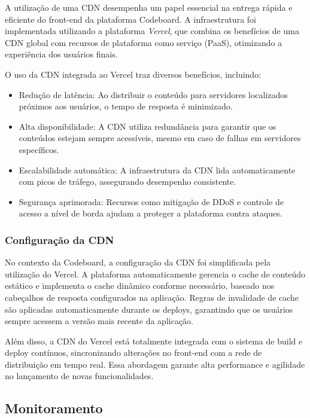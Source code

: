 A utilização de uma CDN desempenha um papel essencial na entrega rápida e eficiente do front-end da plataforma Codeboard. A infraestrutura foi implementada utilizando a plataforma \emph{Vercel}, que combina os benefícios de uma CDN global com recursos de plataforma como serviço (PaaS), otimizando a experiência dos usuários finais.

O uso da CDN integrada ao Vercel traz diversos benefícios, incluindo:

\begin{itemize}
    \item Redução de latência: Ao distribuir o conteúdo para servidores localizados próximos aos usuários, o tempo de resposta é minimizado.
    \item Alta disponibilidade: A CDN utiliza redundância para garantir que os conteúdos estejam sempre acessíveis, mesmo em caso de falhas em servidores específicos.
    \item Escalabilidade automática: A infraestrutura da CDN lida automaticamente com picos de tráfego, assegurando desempenho consistente.
    \item Segurança aprimorada: Recursos como mitigação de DDoS e controle de acesso a nível de borda ajudam a proteger a plataforma contra ataques.
\end{itemize}

\subsubsection{Configuração da CDN}

No contexto da Codeboard, a configuração da CDN foi simplificada pela utilização do Vercel. A plataforma automaticamente gerencia o cache de conteúdo estático e implementa o cache dinâmico conforme necessário, baseado nos cabeçalhos de resposta configurados na aplicação. Regras de invalidade de cache são aplicadas automaticamente durante os deploys, garantindo que os usuários sempre acessem a versão mais recente da aplicação.

Além disso, a CDN do Vercel está totalmente integrada com o sistema de build e deploy contínuos, sincronizando alterações no front-end com a rede de distribuição em tempo real. Essa abordagem garante alta performance e agilidade no lançamento de novas funcionalidades.


\subsection{Monitoramento}

